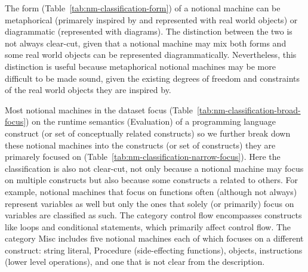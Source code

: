 %
The form (Table~\ref{tab:nm-classification-form}) of
a notional machine
can be
metaphorical (primarely inspired by and represented with real world objects) or
diagrammatic (represented with diagrams).
The distinction between the two is not always clear-cut,
given that
a notional machine may mix both forms
and
some real world objects can be represented diagrammatically.
%
Nevertheless, this distinction is useful because metaphorical notional machines may be more difficult to be made sound, given the existing degrees of freedom and constraints of the real world objects they are inspired by.


Most notional machines in the dataset focus (Table~\ref{tab:nm-classification-broad-focus})
on the runtime semantics (Evaluation) of a programming language construct
(or set of conceptually related constructs)
so
%
we further
break down these notional machines into the constructs (or set of constructs) they are primarely focused on (Table~\ref{tab:nm-classification-narrow-focus}).
%
%
Here the classification is also not clear-cut,
not only because a notional machine may focus on multiple constructs
but also because some constructs a related to others.
For example,
notional machines that focus on functions often (although not always) represent variables as well
but only the ones that solely (or primarily) focus on variables are classified as such.
The category control flow encompasses constructs like loops and conditional statements, which primarily affect control flow.
%
The category Misc
includes five notional machines each of which focuses on a different construct:
string literal,
Procedure (side-effecting functions),
objects,
instructions (lower level operations),
and
one that is not clear from the description.


